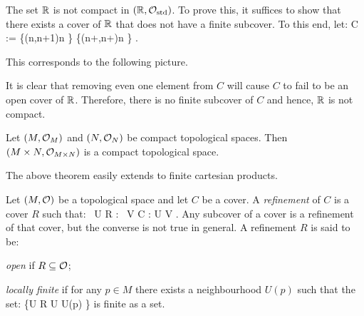 \be
The set $\mathbb{R}$ is not compact in $(\mathbb{R},\mathcal{O}_\mathrm{std})$. To prove this, it suffices to show that there exists a cover of $\mathbb{R}$ that does not have a finite subcover. To this end, let:
\bse
C := \{(n,n+1)\mid n \in \Z\} \cup \{(n+,n+)\mid n \in \Z\} .
\ese

This corresponds to the following picture.

\begin{figure}[h!]
\centering
{}
\end{figure}

It is clear that removing even one element from $C$ will cause $C$ to fail to be an open cover of $\mathbb{R}$. Therefore, there is no finite subcover of $C$ and hence, $\mathbb{R}$ is not compact.
\ee

\bt
Let $(M,\mathcal{O}_M)$ and $(N,\mathcal{O}_N)$ be compact topological spaces. Then $(M\times N,\mathcal{O}_{M\times N})$ is a compact topological space.
\et

The above theorem easily extends to finite cartesian products. 

\bd
Let $(M,\mathcal{O})$ be a topological space and let $C$ be a cover. A \emph{refinement} of $C$ is a cover $R$ such that:
\bse
\forall \, U \in R : \exists \, V \in C : U \se V .
\ese
\ed
Any subcover of a cover is a refinement of that cover, but the converse is not true in general. A refinement $R$ is said to be:
\bit
\item \emph{open} if $R\subseteq \mathcal{O}$;
\item \emph{locally finite} if for any $p\in M$ there exists a neighbourhood $U(p)$ such that the set:
\bse
\{U \in R \mid U \cap U(p) \neq \vn\}
\ese
is finite as a set.
\eit

